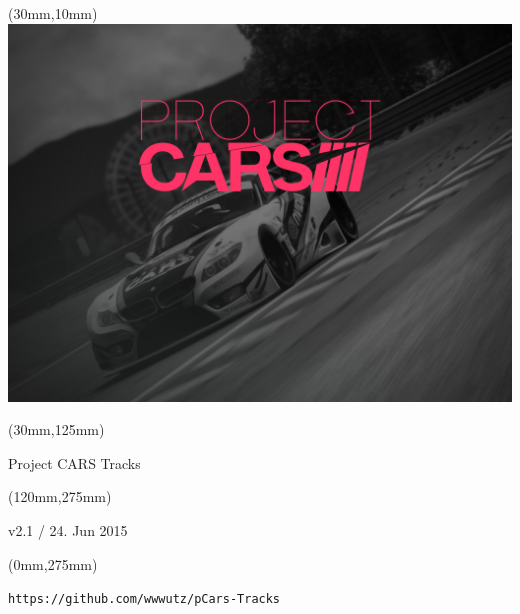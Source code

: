 \documentclass[oneside, a4paper, 12pt]{book}
\begin{document}
\selectfont
\textblockorigin{0cm}{0cm}

\newlength{\Logo}
\setlength{\Logo}{210mm-60mm}
\begin{textblock*}{\Logo}(30mm,10mm)%
\includegraphics[width=\Logo]{pcars-main.png}
\end{textblock*}

\begin{textblock*}{\Logo}(30mm,125mm)%
\begin{center}\Huge{Project CARS Tracks}\end{center}
\end{textblock*}

\begin{textblock*}{90mm}(120mm,275mm)%
\begin{center}\Huge{v2.1 / 24. Jun 2015}\end{center}
\end{textblock*}

\begin{textblock*}{90mm}(0mm,275mm)%
\begin{center}\tt{https://github.com/wwwutz/pCars-Tracks}\end{center}
\end{textblock*}


\null\newpage


\end{document}
